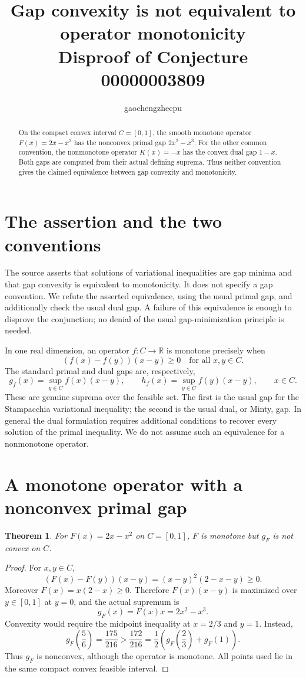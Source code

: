 \documentclass[11pt]{article}
\title{Gap convexity is not equivalent to operator monotonicity\\
\large Disproof of Conjecture 00000003809}
\author{gaochengzhecpu}
\date{}
\newtheorem{theorem}{Theorem}
\begin{document}
\maketitle
\begin{abstract}
On the compact convex interval $C=[0,1]$, the smooth monotone operator $F(x)=2x-x^2$ has the nonconvex primal gap $2x^2-x^3$. For the other common convention, the nonmonotone operator $K(x)=-x$ has the convex dual gap $1-x$. Both gaps are computed from their actual defining suprema. Thus neither convention gives the claimed equivalence between gap convexity and monotonicity.
\end{abstract}

\section*{The assertion and the two conventions}
The source asserts that solutions of variational inequalities are gap minima and that gap convexity is equivalent to monotonicity. It does not specify a gap convention. We refute the asserted equivalence, using the usual primal gap, and additionally check the usual dual gap. A failure of this equivalence is enough to disprove the conjunction; no denial of the usual gap-minimization principle is needed.

In one real dimension, an operator $f:C\to\mathbb R$ is monotone precisely when
\[
 (f(x)-f(y))(x-y)\geq0 \quad\text{for all }x,y\in C.
\]
The standard primal and dual gaps are, respectively,
\[
 g_f(x)=\sup_{y\in C} f(x)(x-y),\qquad
 h_f(x)=\sup_{y\in C} f(y)(x-y),\qquad x\in C.
\]
These are genuine suprema over the feasible set. The first is the usual gap for the Stampacchia variational inequality; the second is the usual dual, or Minty, gap. In general the dual formulation requires additional conditions to recover every solution of the primal inequality. We do not assume such an equivalence for a nonmonotone operator.

\section*{A monotone operator with a nonconvex primal gap}
\begin{theorem}
For $F(x)=2x-x^2$ on $C=[0,1]$, $F$ is monotone but $g_F$ is not convex on $C$.
\end{theorem}
\begin{proof}
For $x,y\in C$,
\[
 (F(x)-F(y))(x-y)=(x-y)^2(2-x-y)\geq0.
\]
Moreover $F(x)=x(2-x)\geq0$. Therefore $F(x)(x-y)$ is maximized over $y\in[0,1]$ at $y=0$, and the actual supremum is
\[
 g_F(x)=F(x)x=2x^2-x^3.
\]
Convexity would require the midpoint inequality at $x=2/3$ and $y=1$. Instead,
\[
 g_F\!\left(\frac56\right)=\frac{175}{216}
 >\frac{172}{216}
 =\frac12\left(g_F\!\left(\frac23\right)+g_F(1)\right).
\]
Thus $g_F$ is nonconvex, although the operator is monotone. All points used lie in the same compact convex feasible interval.
\end{proof}
\end{document}

